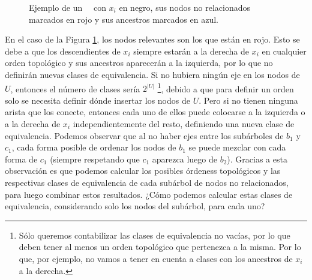 \begin{figure}[ht]
    \caption{Ejemplo de un \ \dtree \ con $x_i$ en negro, sus nodos no relacionados marcados en rojo y sus ancestros marcados en azul.}
    \label{fig:dtreeForestForEquivalenceClasses}
\end{figure}

En el caso de la Figura \ref{fig:dtreeForestForEquivalenceClasses}, los nodos relevantes son los que están en rojo. Esto se debe a que los descendientes de $x_i$ siempre estarán a la derecha de $x_i$ en cualquier orden topológico y sus ancestros aparecerán a la izquierda, por lo que no definirán nuevas clases de equivalencia. Si no hubiera ningún eje en los nodos de $U$, entonces el número de clases sería $2^{|U|}$ \footnote{Sólo queremos contabilizar las clases de equivalencia no vacías, por lo que deben tener al menos un orden topológico que pertenezca a la misma. Por lo que, por ejemplo, no vamos a tener en cuenta a clases con los ancestros de $x_i$ a la derecha.}, debido a que para definir un orden solo se necesita definir dónde insertar los nodos de $U$. Pero si no tienen ninguna arista que los conecte, entonces cada uno de ellos puede colocarse a la izquierda o a la derecha de $x_i$ independientemente del resto, definiendo una nueva clase de equivalencia. Podemos observar que al no haber ejes entre los subárboles de $b_1$ y $c_1$, cada forma posible de ordenar los nodos de $b_1$ se puede mezclar con cada forma de $c_1$ (siempre respetando que $c_1$ aparezca luego de $b_2$). Gracias a esta observación es que podemos calcular los posibles órdeness topológicos y las respectivas clases de equivalencia de cada subárbol de nodos no relacionados, para luego combinar estos resultados. ¿Cómo podemos calcular estas clases de equivalencia, considerando solo los nodos del subárbol, para cada uno?

